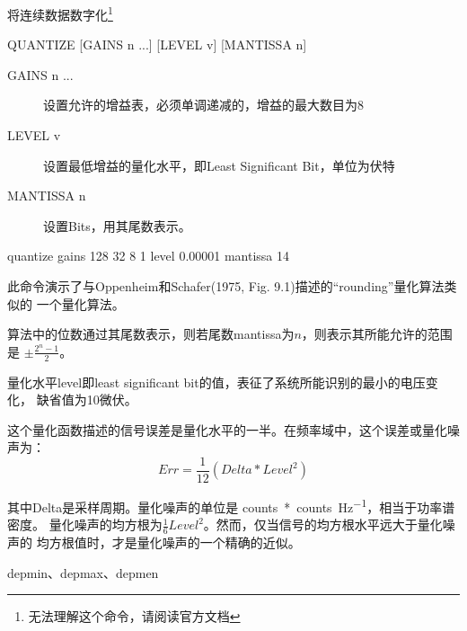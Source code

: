 \label{cmd:quantize}

将连续数据数字化\footnote{无法理解这个命令，请阅读官方文档}

\begin{SACSTX}
QUANTIZE [GAINS n ...] [LEVEL v] [MANTISSA n]
\end{SACSTX}

\begin{description}
\item [GAINS n ...] 设置允许的增益表，必须单调递减的，增益的最大数目为8
\item [LEVEL v] 设置最低增益的量化水平，即Least Significant Bit，单位为伏特
\item [MANTISSA n] 设置Bits，用其尾数表示。
\end{description}

\begin{SACDFT}
quantize gains 128 32 8 1 level 0.00001 mantissa 14
\end{SACDFT}

此命令演示了与Oppenheim和Schafer(1975, Fig. 9.1)描述的``rounding''量化算法类似的
一个量化算法。

算法中的位数通过其尾数表示，则若尾数mantissa为$n$，则表示其所能允许的范围是
$\pm \frac{2^n-1}{2}$。

量化水平level即least significant bit的值，表征了系统所能识别的最小的电压变化，
缺省值为10微伏。

这个量化函数描述的信号误差是量化水平的一半。在频率域中，这个误差或量化噪声为：
\[
    Err = \frac{1}{12}(Delta*Level^2)
\]

其中Delta是采样周期。量化噪声的单位是 \si{counts*counts\per\Hz}，相当于功率谱密度。
量化噪声的均方根为$\frac{1}{6}Level^2$。然而，仅当信号的均方根水平远大于量化噪声的
均方根值时，才是量化噪声的一个精确的近似。

depmin、depmax、depmen
